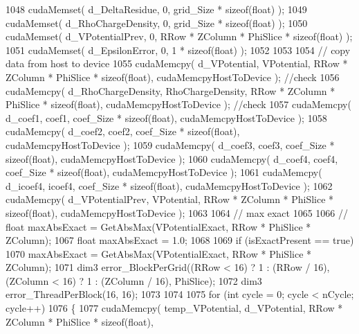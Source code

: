 \begin{DoxyCode}
1048     cudaMemset( d\_DeltaResidue, 0, grid\_Size * \textcolor{keyword}{sizeof}(\textcolor{keywordtype}{float}) );
1049     cudaMemset( d\_RhoChargeDensity, 0, grid\_Size * \textcolor{keyword}{sizeof}(\textcolor{keywordtype}{float}) );
1050     cudaMemset( d\_VPotentialPrev, 0, RRow * ZColumn * PhiSlice * \textcolor{keyword}{sizeof}(\textcolor{keywordtype}{float}) );
1051     cudaMemset( d\_EpsilonError, 0, 1 * \textcolor{keyword}{sizeof}(\textcolor{keywordtype}{float}) );
1052 
1053 
1054     \textcolor{comment}{// copy data from host to device}
1055     cudaMemcpy( d\_VPotential, VPotential, RRow * ZColumn * PhiSlice * \textcolor{keyword}{sizeof}(\textcolor{keywordtype}{float}), cudaMemcpyHostToDevice
       ); \textcolor{comment}{//check}
1056     cudaMemcpy( d\_RhoChargeDensity, RhoChargeDensity, RRow * ZColumn * PhiSlice * \textcolor{keyword}{sizeof}(\textcolor{keywordtype}{float}), 
      cudaMemcpyHostToDevice ); \textcolor{comment}{//check}
1057     cudaMemcpy( d\_coef1, coef1, coef\_Size * \textcolor{keyword}{sizeof}(\textcolor{keywordtype}{float}), cudaMemcpyHostToDevice );
1058     cudaMemcpy( d\_coef2, coef2, coef\_Size * \textcolor{keyword}{sizeof}(\textcolor{keywordtype}{float}), cudaMemcpyHostToDevice );
1059     cudaMemcpy( d\_coef3, coef3, coef\_Size * \textcolor{keyword}{sizeof}(\textcolor{keywordtype}{float}), cudaMemcpyHostToDevice );
1060     cudaMemcpy( d\_coef4, coef4, coef\_Size * \textcolor{keyword}{sizeof}(\textcolor{keywordtype}{float}), cudaMemcpyHostToDevice );
1061     cudaMemcpy( d\_icoef4, icoef4, coef\_Size * \textcolor{keyword}{sizeof}(\textcolor{keywordtype}{float}), cudaMemcpyHostToDevice );
1062     cudaMemcpy( d\_VPotentialPrev, VPotential, RRow * ZColumn * PhiSlice * \textcolor{keyword}{sizeof}(\textcolor{keywordtype}{float}), 
      cudaMemcpyHostToDevice );
1063     
1064     \textcolor{comment}{// max exact}
1065     
1066     \textcolor{comment}{// float maxAbsExact = GetAbsMax(VPotentialExact, RRow * PhiSlice * ZColumn);}
1067     \textcolor{keywordtype}{float} maxAbsExact = 1.0;
1068 
1069     \textcolor{keywordflow}{if} (isExactPresent == \textcolor{keyword}{true})
1070         maxAbsExact = GetAbsMax(VPotentialExact, RRow * PhiSlice * ZColumn);
1071     dim3 error\_BlockPerGrid((RRow < 16) ? 1 : (RRow / 16), (ZColumn < 16) ? 1 : (ZColumn / 16), PhiSlice);
1072     dim3 error\_ThreadPerBlock(16, 16);      
1073 
1074     
1075     \textcolor{keywordflow}{for} (\textcolor{keywordtype}{int} cycle = 0; cycle < nCycle; cycle++)
1076     \{
1077         cudaMemcpy( temp\_VPotential, d\_VPotential, RRow * ZColumn * PhiSlice * \textcolor{keyword}{sizeof}(\textcolor{keywordtype}{float}), 

\end{DoxyCode}
